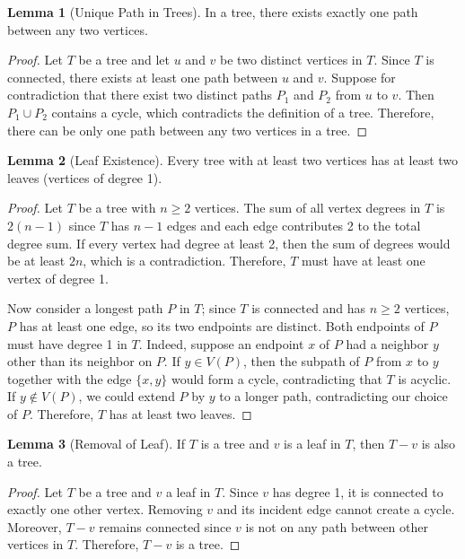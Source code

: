 \documentclass{article}
\theoremstyle{definition}
\newtheorem{lemma}{Lemma}
\begin{document}
\begin{lemma}[Unique Path in Trees]
In a tree, there exists exactly one path between any two vertices.
\end{lemma}

\begin{proof}
Let $T$ be a tree and let $u$ and $v$ be two distinct vertices in $T$. Since $T$ is connected, there exists at least one path between $u$ and $v$. Suppose for contradiction that there exist two distinct paths $P_1$ and $P_2$ from $u$ to $v$. Then $P_1 \cup P_2$ contains a cycle, which contradicts the definition of a tree. Therefore, there can be only one path between any two vertices in a tree.
\end{proof}

\begin{lemma}[Leaf Existence]
Every tree with at least two vertices has at least two leaves (vertices of degree 1).
\end{lemma}

\begin{proof}
Let $T$ be a tree with $n \geq 2$ vertices. The sum of all vertex degrees in $T$ is $2(n-1)$ since $T$ has $n-1$ edges and each edge contributes 2 to the total degree sum. If every vertex had degree at least 2, then the sum of degrees would be at least $2n$, which is a contradiction. Therefore, $T$ must have at least one vertex of degree 1.

Now consider a longest path $P$ in $T$; since $T$ is connected and has $n \geq 2$ vertices, $P$ has at least one edge, so its two endpoints are distinct. Both endpoints of $P$ must have degree 1 in $T$. Indeed, suppose an endpoint $x$ of $P$ had a neighbor $y$ other than its neighbor on $P$. If $y \in V(P)$, then the subpath of $P$ from $x$ to $y$ together with the edge $\{x,y\}$ would form a cycle, contradicting that $T$ is acyclic. If $y \notin V(P)$, we could extend $P$ by $y$ to a longer path, contradicting our choice of $P$. Therefore, $T$ has at least two leaves.
\end{proof}

\begin{lemma}[Removal of Leaf]
If $T$ is a tree and $v$ is a leaf in $T$, then $T - v$ is also a tree.
\end{lemma}

\begin{proof}
Let $T$ be a tree and $v$ a leaf in $T$. Since $v$ has degree 1, it is connected to exactly one other vertex. Removing $v$ and its incident edge cannot create a cycle. Moreover, $T - v$ remains connected since $v$ is not on any path between other vertices in $T$. Therefore, $T - v$ is a tree.
\end{proof}
\end{document}
